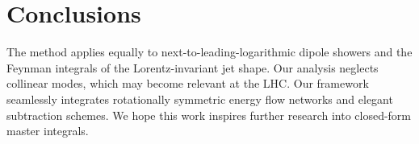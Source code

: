 \section{Conclusions}\label{sec:conclusions}

The method applies equally to next-to-leading-logarithmic dipole showers
and the Feynman integrals of the Lorentz-invariant jet shape. Our
analysis neglects collinear modes, which may become relevant at the LHC.
Our framework seamlessly integrates rotationally symmetric energy flow
networks and elegant subtraction schemes. We hope this work inspires
further research into closed-form master integrals.

